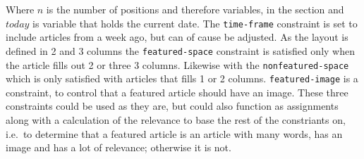 Where $n$ is the number of positions and therefore variables, in the section and $today$ is variable that holds the current date. The \texttt{time-frame} constraint is set to include articles from a week ago, but can of cause be adjusted. As the layout is defined in 2 and 3 columns the \texttt{featured-space} constraint is satisfied only when the article fills out 2 or three 3 columns. Likewise with the \texttt{nonfeatured-space} which is only satisfied with articles that fills 1 or 2 columns. \texttt{featured-image} is a constraint, to control that a featured article should have an image. These three constraints could be used as they are, but could also function as assignments along with a calculation of the relevance to base the rest of the constriants on, i.e.\ to determine that a featured article is an article with many words, has an image and has a lot of relevance; otherwise it is not.

